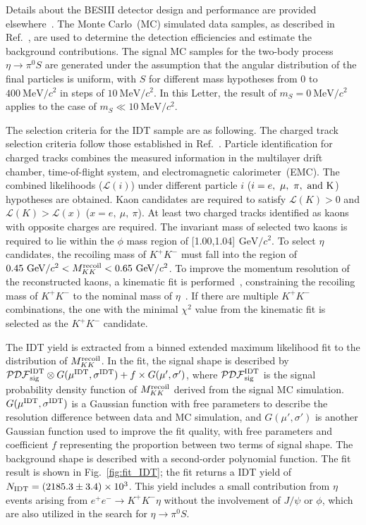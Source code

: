 \documentclass[
 reprint,
 amsmath,amssymb,a
 aps,
 twocolumn
]{revtex4-2}
\def \gevcc{~\mbox{GeV/$c^2$}}
\def \mevcc{~\mbox{MeV/$c^2$}}
\def \jpsi {J/\psi}
\begin{document}
Details about the BESIII detector design and performance are provided elsewhere~\cite{BESIII:2009fln}. The Monte Carlo~(MC) simulated data samples, as described in Ref.~\cite{BESIII:2023fqz}, are used to determine the detection efficiencies and estimate the background contributions.
The signal MC samples for the two-body process $\eta\to\pi^0S$ are
generated under the assumption that the angular distribution of the
final particles is uniform, with $S$ for different mass hypotheses
from 0 to $400\mevcc$ in steps of $10\mevcc$. In this Letter, the result of $m_S=0\mevcc$ applies to the case of $m_S\ll10\mevcc$.

The selection criteria for the IDT sample are as following.
The charged track selection criteria follow those established in Ref.~\cite{BESIII:2023fqz}.
Particle identification for charged tracks combines the measured information in the multilayer drift chamber, time-of-flight system, and electromagnetic calorimeter~(EMC). The combined likelihoods ($\mathcal{L}(i)$) under different particle $i$ ($i=e,~\mu,~\pi,~\rm{and}~K$) hypotheses are obtained. Kaon candidates are required to satisfy $\mathcal{L}(K)>0$ and $\mathcal{L}(K)>\mathcal{L}(x)$ ($x=e,~\mu,~\pi$).
At least two charged tracks identified as kaons with opposite charges are required.
The invariant mass of selected two kaons is required to lie within the $\phi$ mass region of [1.00,1.04]\,$\gevcc$. To select $\eta$ candidates, the recoiling mass of $K^+K^-$ must fall into the region of $0.45\gevcc<M^{\rm{recoil}}_{KK}<0.65\gevcc$.
To improve the momentum resolution of the reconstructed kaons, a kinematic fit is performed~\cite{Yan:2010zze}, constraining the recoiling mass of $K^+K^-$ to the nominal mass of $\eta$~\cite{pdg:2024}. If there are multiple $K^+K^-$ combinations, the one with the minimal $\chi^2$ value from the kinematic fit is selected as the $K^+K^-$ candidate.

The IDT yield is extracted from a binned extended maximum likelihood fit to the distribution of $M^{\rm{recoil}}_{KK}$. In the fit, the signal shape is described by $\mathcal{PDF}^{\rm{IDT}}_{\rm{sig}}\otimes G(\mu^{\rm{IDT}},\sigma^{\rm{IDT}})+f\times G(\mu',\sigma')$,
where $\mathcal{PDF}^{\rm{IDT}}_{\rm{sig}}$ is the signal probability
density function of $M^{\rm{recoil}}_{KK}$ derived from the signal MC
simulation. $G(\mu^{\rm{IDT}},\sigma^{\rm{IDT}})$ is a
Gaussian function with free parameters to describe the resolution
difference between data and MC simulation, and $G(\mu',\sigma')$ is another Gaussian function used to improve the fit quality, with free parameters and coefficient $f$ representing the proportion between two terms of signal shape.
The background shape is described with a second-order polynomial function.
The fit result is shown in Fig.~\ref{fig:fit_IDT}; the fit returns a IDT yield of $N_{\rm{IDT}}=(2185.3\pm3.4)\times10^3$.
This yield includes a small contribution from $\eta$ events arising from $e^+e^-\to K^+K^-\eta$ without the involvement of $\jpsi$ or $\phi$, which are also  utilized in the search for $\eta\to\pi^0S$.
\end{document}
